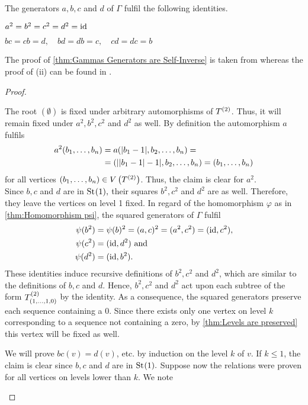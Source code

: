 \begin{thm}\label{thm:Relations of the generators of Gamma}
The generators $a,b,c$ and $d$ of $\Gamma$ fulfil the following identities.
\begin{thmlist}
\item $a^2=b^2=c^2=d^2=\operatorname{id}$\label{thm:Gammas Generators are Self-Inverse}
\item $bc=cb=d,\quad bd=db=c,\quad cd=dc=b$\label{thm:Three Generators Suffice}
\end{thmlist}
\end{thm}

The proof of \cref{thm:Gammas Generators are Self-Inverse} is taken from \cite{hudec2006burnside} whereas the proof of (ii) can be found in \cite{waddle2008grigorchuk}.

\begin{proof}
\begin{plist}
\item The root $(\emptyset)$ is fixed under arbitrary automorphisms of $T^{(2)}$. Thus, it will remain fixed under $a^2,b^2,c^2$ and $d^2$ as well. By definition the automorphism $a$ fulfils
\begin{align*}
a^2(b_{1},\ldots,b_{n})	&=a(\lvert b_1-1\rvert,b_2,\ldots,b_n)=\\
			&=(\lvert\lvert b_1-1\rvert-1\rvert,b_2,\ldots,b_n)=(b_{1},\ldots,b_{n})
\end{align*}
for all vertices $(b_{1},\ldots,b_{n})\in V\left(T^{(2)}\right)$. Thus, the claim is clear for $a^2.$\\
Since $b,c$ and $d$ are in $\mathrm{St}_{}(1),$ their squares $b^2,c^2$ and $d^2$ are as well. Therefore, they leave the vertices on level 1 fixed. In regard of the homomorphism $\varphi$ as in \cref{thm:Homomorphism psi}, the squared generators of $\Gamma$ fulfil
\begin{align*}
\psi(b^2)	&=\psi(b)^2=(a,c)^2=(a^2,c^2)=(\operatorname{id},c^2),\\
\psi(c^2)	&=(\operatorname{id},d^2) \text{ and}\\
\psi(d^2)	&=(\operatorname{id},b^2).
\end{align*}
These identities induce recursive definitions of $b^2,c^2$ and $d^2$, which are similar to the definitions of $b,c$ and $d$. Hence, $b^2,c^2$ and $d^2$ act upon each subtree of the form $T^{(2)}_{(1,\ldots,1,0)}$ by the identity. As a consequence, the squared generators preserve each sequence containing a 0. Since there exists only one vertex on level $k$ corresponding to a sequence not containing a zero, by \cref{thm:Levels are preserved} this vertex will be fixed as well.
\item We will prove $bc(v)=d(v)$, etc. by induction on the level $k$ of $v$.  If $k\leq 1$, the claim is clear since $b,c$ and $d$ are in $\mathrm{St}_{}(1).$ Suppose now the relations were proven for all vertices on levels lower than $k.$ We note

\end{plist}
\end{proof}

